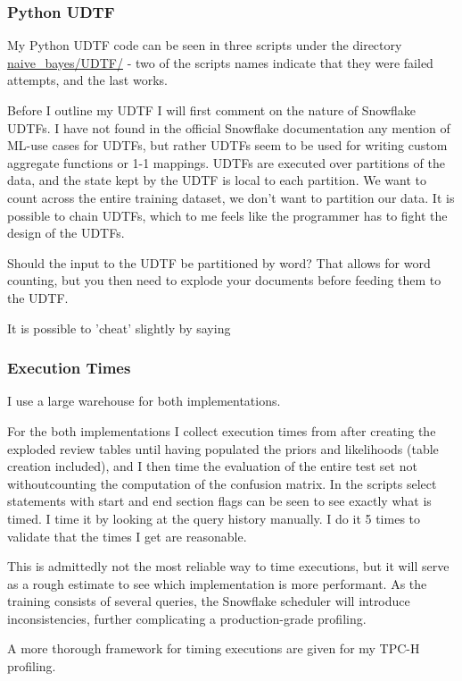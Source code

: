 \documentclass{article}
\begin{document}
\subsubsection{Python UDTF}
My Python UDTF code can be seen in three scripts under the directory \url{naive_bayes/UDTF/} - two of the scripts names indicate that they were failed attempts, and the last works. 

\medskip \noindent Before I outline my UDTF I will first comment on the nature of Snowflake UDTFs. I have not found in the official Snowflake documentation any mention of ML-use cases for UDTFs, but rather UDTFs seem to be used for writing custom aggregate functions or 1-1 mappings. UDTFs are executed over partitions of the data, and the state kept by the UDTF is local to each partition. 
We want to count across the entire training dataset, we don't want to partition our data. It is possible to chain UDTFs, which to me feels like the programmer has to fight the design of the UDTFs. 

\medskip \noindent Should the input to the UDTF be partitioned by word? That allows for word counting, but you then need to explode your documents before feeding them to the UDTF.

\medskip \noindent It is possible to 'cheat' slightly by saying 

\subsubsection{Execution Times}
I use a large warehouse for both implementations. 

\medskip \noindent For the both implementations I collect execution times from after creating the exploded review tables until having populated the priors and likelihoods (table creation included), and I then time the evaluation of the entire test set not withoutcounting the computation of the confusion matrix. In the scripts select statements with start and end section flags can be seen to see exactly what is timed. I time it by looking at the query history manually. I do it 5 times to validate that the times I get are reasonable. 

\medskip \noindent This is admittedly not the most reliable way to time executions, but it will serve as a rough estimate to see which implementation is more performant. As the training consists of several queries, the Snowflake scheduler will introduce inconsistencies, further complicating a production-grade profiling. 

\medskip \noindent A more thorough framework for timing executions are given for my TPC-H profiling. 
\end{document}
